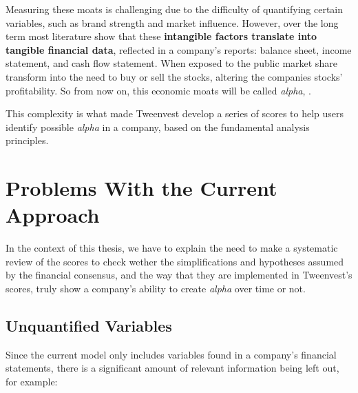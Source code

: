 \documentclass[11pt,english,a4paper,hidelinks]{book}
\begin{document}
\vspace{0.5cm}
\noindent Measuring these moats is challenging due to the difficulty of quantifying certain variables, such as brand strength and market influence. However, over the long term most literature show that these \textbf{intangible factors translate into tangible financial data}, reflected in a company's reports: balance sheet, income statement, and cash flow statement. When exposed to the public market share transform into the need to buy or sell the stocks, altering the companies stocks' profitability. So from now on, this economic moats will be called \textit{alpha}, \textcite{sharpe1964capm}.

\vspace{0.5cm}
\noindent This complexity is what made Tweenvest develop a series of scores to help users identify possible \textit{alpha} in a company, based on the fundamental analysis principles.

\section{Problems With the Current Approach}

\noindent In the context of this thesis, we have to explain the need to make a systematic review of the scores to check wether the simplifications and hypotheses assumed by the financial consensus, and the way that they are implemented in Tweenvest's scores, truly show a company's ability to create \textit{alpha} over time or not.


\subsection{Unquantified Variables}
\noindent Since the current model only includes variables found in a company's financial statements, there is a significant amount of relevant information being left out, for example:
\end{document}
